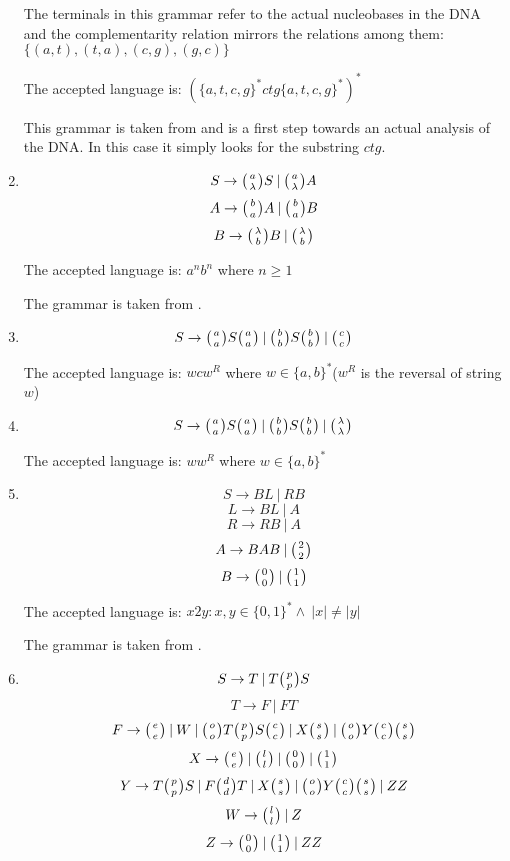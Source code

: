 \begin{enumerate}
{    The terminals in this grammar refer to the actual nucleobases in the DNA and the complementarity relation mirrors the relations among them: $\{(a, t), (t, a), (c, g), (g, c)\}$

    The accepted language is: $(\{a,t,c,g\}^*ctg\{a,t,c,g\}^*)^*$

    This grammar is taken from \cite{WK_GRAMMARS_1} and is a first step towards an actual analysis of the DNA. In this case it simply looks for the substring $ctg$.
  }

  \item{
    $$S \rightarrow \wkpair{a}{\lambda} S \:|\: \wkpair{a}{\lambda} A$$
    $$A \rightarrow \wkpair{b}{a} A \:|\: \wkpair{b}{a} B$$
    $$B \rightarrow \wkpair{\lambda}{b} B \:|\: \wkpair{\lambda}{b}$$


    The accepted language is: $a^nb^n$ where $n \geq 1$

    The grammar is taken from \cite{REG_GRAMMAR}.
  }

  \item{
    $$S \rightarrow \wkpair{a}{a} S \wkpair{a}{a} \:|\: \wkpair{b}{b} S \wkpair{b}{b} \:|\: \wkpair{c}{c}$$

    The accepted language is: $wcw^R$ where $w \in \{a, b\}^*$($w^R$ is the reversal of string $w$)
  }

  \item{
    $$S \rightarrow \wkpair{a}{a} S \wkpair{a}{a} \:|\: \wkpair{b}{b} S \wkpair{b}{b} \:|\: \wkpair{\lambda}{\lambda}$$

    The accepted language is: $ww^R$ where $w \in \{a, b\}^*$
  }

  \item{
    $$S \rightarrow B L \:|\: R B$$
    $$L \rightarrow B L \:|\: A$$
    $$R \rightarrow R B \:|\: A$$
    $$A \rightarrow B A B \:|\: \wkpair{2}{2}$$
    $$B \rightarrow \wkpair{0}{0} \:|\: \wkpair{1}{1}$$

    The accepted language is: $x2y: x, y \in \{0,1\}^* \wedge \:|x| \neq |y|$

    The grammar is taken from \cite{GRAMMAR_9}.
  }

  \item{
    $$S \rightarrow T \:|\: T \wkpair{p}{p} S$$
    $$T \rightarrow F \:|\: F T$$
    $$F \rightarrow \wkpair{e}{e} \:|\: W \:|\: \wkpair{o}{o} T \wkpair{p}{p} S \wkpair{c}{c} \:|\: X \wkpair{s}{s} \:|\: \wkpair{o}{o} Y \wkpair{c}{c} \wkpair{s}{s}$$
    $$X \rightarrow \wkpair{e}{e} \:|\: \wkpair{l}{l} \:|\: \wkpair{0}{0} \:|\: \wkpair{1}{1}$$
    $$Y \rightarrow T \wkpair{p}{p} S \:|\: F \wkpair{d}{d} T \:|\: X \wkpair{s}{s} \:|\: \wkpair{o}{o} Y \wkpair{c}{c} \wkpair{s}{s} \:|\: Z Z$$
    $$W \rightarrow \wkpair{l}{l} \:|\: Z$$
    $$Z \rightarrow \wkpair{0}{0} \:|\: \wkpair{1}{1} \:|\: Z Z$$

}
\end{enumerate}
